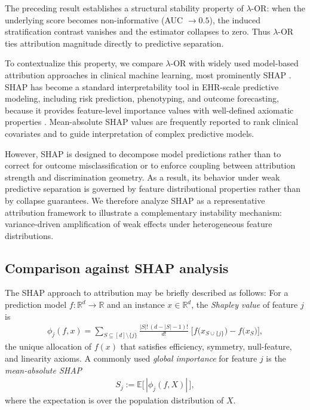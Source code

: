\documentclass[pdflatex,sn-mathphys-num]{sn-jnl}%
\def\EQSP{3pt}
\newcommand{\cgather}[2][\EQSP]{\begingroup\setlength\abovedisplayskip{#1}\setlength\belowdisplayskip{#1}\begin{gather} #2 \end{gather}\endgroup\noindent}
\theoremstyle{thmstyleone}%
\theoremstyle{thmstyletwo}%
\theoremstyle{thmstylethree}%
\begin{document}
The preceding result establishes a structural stability property of $\lambda$-OR: 
when the underlying score becomes non-informative (AUC $\to 0.5$), 
the induced stratification contrast vanishes and the estimator collapses to zero. 
Thus $\lambda$-OR ties attribution magnitude directly to predictive separation.

To contextualize this property, we compare $\lambda$-OR with widely used 
model-based attribution approaches in clinical machine learning, 
most prominently SHAP  
\cite{Lundberg2017Unified}. 
SHAP has become a standard interpretability tool in EHR-scale predictive modeling, 
including risk prediction, phenotyping, and outcome forecasting, 
because it provides feature-level importance values with well-defined axiomatic properties 
\cite{Lundberg2017Unified, Choi2016RETAIN}. 
Mean-absolute SHAP values are frequently reported to rank clinical covariates 
and to guide interpretation of complex predictive models.

However, SHAP is designed to decompose model predictions rather than 
to correct for outcome misclassification or to enforce coupling between 
attribution strength and discrimination geometry. 
As a result, its behavior under weak predictive separation is governed 
by feature distributional properties rather than by collapse guarantees. 
We therefore analyze SHAP as a representative attribution framework 
to illustrate a complementary instability mechanism: 
variance-driven amplification of weak effects under heterogeneous feature distributions.


\subsection{Comparison against SHAP analysis}

The SHAP approach to attribution may be briefly described as follows: For a prediction model
$f:\mathbb R^{d}\to\mathbb R$ and an instance $x\in\mathbb R^{d}$, the \emph{Shapley value} of feature $j$
is
\cgather{
\phi_{j}(f,x)
=\!\!\sum_{S\subseteq[d]\setminus\{j\}}\!\!
   \frac{|S|!\,(d-|S|-1)!}{d!}\;
   \bigl[f\bigl(x_{S\cup\{j\}}\bigr)-f\bigl(x_{S}\bigr)\bigr],
}
the unique allocation of $f(x)$ that satisfies efficiency, symmetry,
null-feature, and linearity axioms.
A commonly used \emph{global importance} for feature $j$ is the
\emph{mean-absolute SHAP}
\cgather{
S_{j} := \mathbb E\bigl[\,|\phi_{j}(f,X)|\,\bigr],
\label{SHAP-MA}
}
where the expectation is over the population distribution of $X$.
\end{document}
